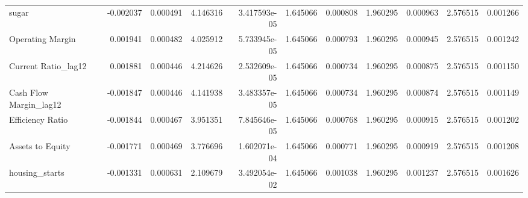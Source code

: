 \documentclass[12pt,a4paper,english]{article}
\begin{document}
{{\begin{tabular}{@{}lrrrrrrrrrr@{}}
			sugar                         & -0.002037                & 0.000491                    & 4.146316                  & 3.417593e-05                             & 1.645066                      & 0.000808                      & 1.960295                     & 0.000963                     & 2.576515                     & 0.001266                     \\
			Operating Margin              & 0.001941                 & 0.000482                    & 4.025912                  & 5.733945e-05                             & 1.645066                      & 0.000793                      & 1.960295                     & 0.000945                     & 2.576515                     & 0.001242                     \\
			Current Ratio\_lag12          & 0.001881                 & 0.000446                    & 4.214626                  & 2.532609e-05                             & 1.645066                      & 0.000734                      & 1.960295                     & 0.000875                     & 2.576515                     & 0.001150                     \\
			Cash Flow Margin\_lag12       & -0.001847                & 0.000446                    & 4.141938                  & 3.483357e-05                             & 1.645066                      & 0.000734                      & 1.960295                     & 0.000874                     & 2.576515                     & 0.001149                     \\
			Efficiency Ratio              & -0.001844                & 0.000467                    & 3.951351                  & 7.845646e-05                             & 1.645066                      & 0.000768                      & 1.960295                     & 0.000915                     & 2.576515                     & 0.001202                     \\
			Assets to Equity              & -0.001771                & 0.000469                    & 3.776696                  & 1.602071e-04                             & 1.645066                      & 0.000771                      & 1.960295                     & 0.000919                     & 2.576515                     & 0.001208                     \\
			housing\_starts               & -0.001331                & 0.000631                    & 2.109679                  & 3.492054e-02                             & 1.645066                      & 0.001038                      & 1.960295                     & 0.001237                     & 2.576515                     & 0.001626                     \\

\end{tabular}}}
\end{document}
